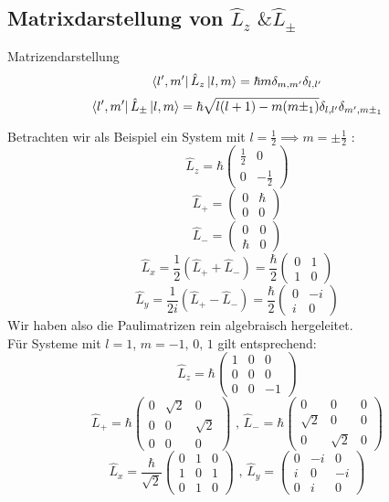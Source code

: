 \documentclass{report}
\begin{document}
\subsection{Matrixdarstellung von $\hat{L}_z \text{ \& } \hat{L}_{\pm}$ }
\begin{redbox}{Matrizendarstellung}
	\[
		\bra{l',m'} \hat{L}_z \ket{l,m} = \hbar m \delta_{m,m'} \delta_{l,l'}
	\] \[
	\bra{l',m'} \hat{L}_{\pm} \ket{l,m}  = \hbar \sqrt{l(l+1) - m(m\pm_1)} \delta_{l,l'}\delta_{m',m\pm_1}
	\] 
\end{redbox}
Betrachten wir als Beispiel ein System mit $l = \frac{1}{2} \implies m = \pm \frac{1}{2}$ : \[
	\hat{L}_z = \hbar \begin{pmatrix} \frac{1}{2} & 0\\0 & -\frac{1}{2} \end{pmatrix}
\] \[
\hat{L}_+ = \begin{pmatrix} 0 & \hbar \\ 0 & 0 \end{pmatrix} 
\]  \[
\hat{L}_- = \begin{pmatrix} 0 & 0 \\ \hbar & 0 \end{pmatrix} 
\]  \[
\hat{L}_x = \frac{1}{2}(\hat{L}_+ + \hat{L}_-) = \frac{\hbar}{2} \begin{pmatrix} 0 & 1 \\ 1 & 0 \end{pmatrix} 
\] \[
\hat{L}_y =\frac{1}{2i} \left( \hat{L}_+ -  \hat{L}_- \right) = \frac{\hbar}{2} \begin{pmatrix} 0 & -i \\ i & 0  \end{pmatrix}  
\] Wir haben also die Paulimatrizen rein algebraisch hergeleitet. \\
Für Systeme mit $l = 1$, $m= -1 \text{, } 0 \text{, } 1$ gilt entsprechend: \[
	\hat{L}_z = \hbar \begin{pmatrix} 1 &0&0\\ 0&0&0\\ 0&0&-1 \end{pmatrix} 
\] \[
\hat{L}_+ = \hbar \begin{pmatrix} 0 & \sqrt{2} & 0 \\ 0 &0 & \sqrt{2} \\ 0&0&0 \end{pmatrix} \text{ , } \hat{L}_- = \hbar \begin{pmatrix} 0&0&0 \\ \sqrt{2} &0&0 \\ 0&\sqrt{2} &0 \end{pmatrix} 
\] \[
\hat{L}_x = \frac{\hbar}{\sqrt{2} } \begin{pmatrix} 0&1&0 \\ 1&0&1 \\ 0&1&0 \end{pmatrix} \text{ , } \hat{L}_y = \begin{pmatrix} 0 & -i &0 \\i &0 &-i \\ 0&i&0 \end{pmatrix} 
\]  
\end{document}
